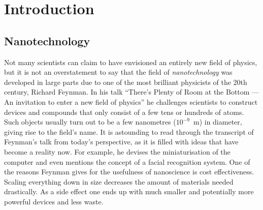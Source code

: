
\chapter{Introduction}
\label{sec:introduction}

%
\section{Nanotechnology}
\label{sec:nanotechnology}

Not many scientists can claim to have envisioned an entirely new field of
physics, but it is not an overstatement to say that the field of
\emph{nanotechnology} was developed in large parts due to one of the most
brilliant physicists of the 20th century, Richard Feynman. In his talk ``There's
Plenty of Room at the Bottom --- An invitation to enter a new field of
physics''\autocite{Feynman_TherePlentyRoom_1960} he challenges scientists to
construct devices and compounds that only consist of a few tens or hundreds of
atoms. Such objects usually turn out to be a few nanometres ($10^{-9}$~m) in
diameter, giving rise to the field's name. It is astounding to read through the
transcript of Feynman's talk from today's perspective, as it is filled with
ideas that have become a reality now. For example, he devises the
miniaturisation of the computer and even mentions the concept of a facial
recognition system. One of the reasons Feynman gives for the usefulness of nanoscience 
is cost effectiveness. Scaling everything down in size decreases the
amount of materials needed drastically. As a side effect one ends up with much
smaller and potentially more powerful devices and less waste.


